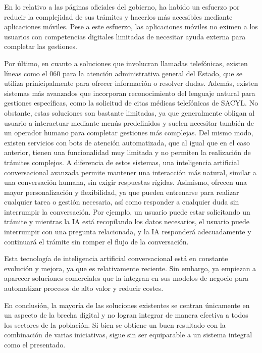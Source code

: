\documentclass[12pt, a4paper, twoside]{report}
\begin{document}
        En lo relativo a las páginas oficiales del gobierno, ha habido un esfuerzo por reducir la complejidad de sus trámites y hacerlos más accesibles mediante aplicaciones móviles.
        Pese a este esfuerzo, las aplicaciones móviles no eximen a los usuarios con competencias digitales limitadas de necesitar ayuda externa para completar las gestiones.

        Por último, en cuanto a soluciones que involucran llamadas telefónicas, existen líneas como el 060 para la atención administrativa general del Estado, que se utiliza prinicipalmente para ofrecer información o resolver dudas.
        Además, existen sistemas más avanzados que incorporan reconocimiento del lenguaje natural para gestiones específicas, como la solicitud de citas médicas telefónicas de SACYL. 
        No obstante, estas soluciones son bastante limitadas, ya que generalmente obligan al usuario a interactuar mediante menús predefinidos y suelen necesitar también de un operador humano para completar gestiones más complejas.
        Del mismo modo, existen servicios con bots de atención automatizada, que al igual que en el caso anterior, tienen una funcionalidad muy limitada y no permiten la realización de trámites complejos.
        A diferencia de estos sistemas, una inteligencia artificial conversacional avanzada permite mantener una interacción más natural, similar a una conversación humana, sin exigir respuestas rígidas.
        Asimismo, ofrecen una mayor personalización y flexibilidad, ya que pueden entrenarse para realizar cualquier tarea o gestión necesaria, así como responder a cualquier duda sin interrumpir la conversación. 
        Por ejemplo, un usuario puede estar solicitando un trámite y mientras la IA está recopilando los datos necesarios, el usuario puede interrumpir con una pregunta relacionada, y la IA responderá adecuadamente y continuará el trámite sin romper el flujo de la conversación.

        Esta tecnología de inteligencia artificial conversacional está en constante evolución y mejora, ya que es relativamente reciente. Sin embargo, ya empiezan a aparecer soluciones comerciales que la integran en sus modelos de negocio para automatizar procesos de alto valor y reducir costes.

        En conclusión, la mayoría de las soluciones existentes se centran únicamente en un aspecto de la brecha digital y no logran integrar de manera efectiva a todos los sectores de la población. 
        Si bien se obtiene un buen resultado con la combinación de varias iniciativas, sigue sin ser equiparable a un sistema integral como el presentado.
\end{document}

